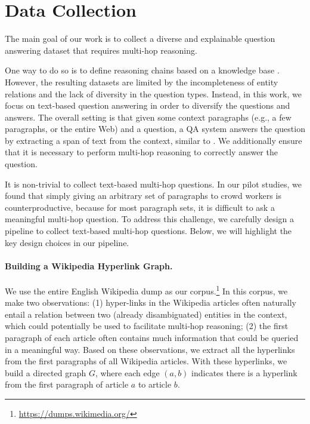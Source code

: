 \section{Data Collection} \label{sec:collect}

The main goal of our work is to collect a diverse and explainable question answering dataset that requires multi-hop reasoning.

One way to do so is to define reasoning chains based on a knowledge base \cite{welbl2017constructing,talmor2018web}. However, the resulting datasets are limited by the incompleteness of entity relations and the lack of diversity in the question types. Instead, in this work, we focus on text-based question answering in order to diversify the questions and answers. The overall setting is that given some context paragraphs (e.g., a few paragraphs, or the entire Web) and a question, a QA system answers the question by extracting a span of text from the context, similar to \citet{rajpurkar2016squad}.
We additionally ensure that it is necessary to perform multi-hop reasoning to correctly answer the question.

It is non-trivial to collect text-based multi-hop questions. In our pilot studies, we found that simply giving an arbitrary set of paragraphs to crowd workers is counterproductive, because for most paragraph sets, it is difficult to ask a meaningful multi-hop question. To address this challenge, we carefully design a pipeline to collect text-based multi-hop questions. Below, we will highlight the key design choices in our pipeline.

\paragraph{Building a Wikipedia Hyperlink Graph.} We use the entire English Wikipedia dump as our corpus.\footnote{\url{https://dumps.wikimedia.org/}}
In this corpus, we make two observations: (1) hyper-links in the Wikipedia articles often naturally entail a relation between two (already disambiguated) entities in the context, which could potentially be used to facilitate multi-hop reasoning; (2) the first paragraph of each article often contains much information that could be queried in a meaningful way. Based on these observations, we extract all the hyperlinks from the first paragraphs of all Wikipedia articles. With these hyperlinks, we build a directed graph $G$, where each edge $(a, b)$ indicates there is a hyperlink from the first paragraph of article $a$ to article $b$.

